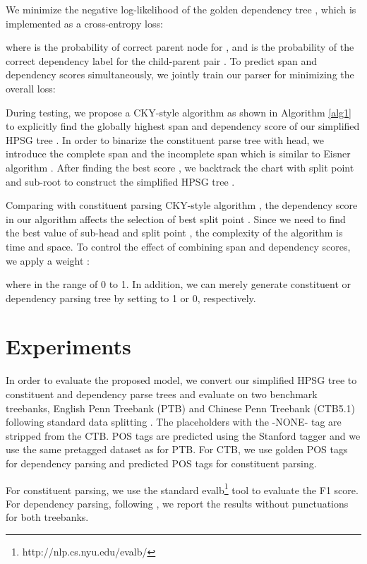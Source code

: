 \documentclass[11pt,a4paper]{article}
\begin{document}
We minimize the negative log-likelihood of the golden dependency tree , which is implemented as a cross-entropy loss:

where  is the probability of correct parent node  for , and  is the probability of the correct dependency label  for the child-parent pair .
To predict span and dependency scores simultaneously, we jointly train our parser for minimizing the overall loss:

During testing, we propose a CKY-style algorithm as shown in Algorithm \ref{alg1} to explicitly find the globally highest span and dependency score  of our simplified HPSG tree . 
In order to binarize the constituent parse tree with head, we 
introduce the complete span  and the incomplete span  which is similar to Eisner algorithm \cite{EisnerP96}.
After finding the best score , we backtrack the chart with split point  and sub-root  to construct the simplified HPSG tree . 

Comparing with constituent parsing CKY-style algorithm \cite{SternP17}, the dependency score  in our algorithm affects the selection of best split point .
Since we need to find the best value of sub-head  and split point ,
the complexity of the algorithm is  time and  space.
To control the effect of combining span and dependency scores, we apply a weight :

where  in the range of 0 to 1.
In addition, we can merely generate constituent or dependency parsing tree by setting  to 1 or 0, respectively.
\label{Joint Span Decoder}


\section{Experiments}

In order to evaluate the proposed model, we convert our simplified HPSG tree to constituent and dependency parse trees and evaluate on two benchmark treebanks, English Penn Treebank (PTB) and Chinese Penn Treebank (CTB5.1) following standard data splitting \cite{ZhangD08, Liuandzhang2017B}. The placeholders with the -NONE- tag are stripped from the CTB. 
POS tags are predicted using the Stanford tagger \cite{Toutanova:2003} and we use the same pretagged dataset as \cite{Cross} for PTB.
For CTB, we use golden POS tags for dependency parsing and predicted POS tags for constituent parsing.

For constituent parsing, we use the standard evalb{\footnote{http://nlp.cs.nyu.edu/evalb/}} tool to evaluate the F1 score. For dependency parsing, following \cite{Dozat2017Deep, Kuncoro2016Distilling, Ma2018Stack}, we report the results without punctuations for both treebanks.
\end{document}
